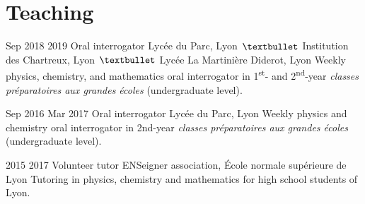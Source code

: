 \documentclass[letterpaper]{cvtemplate_en} %
\begin{document}
\section{Teaching}
\begin{cvbody}

\cvitem
	{Sep 2018}
	{2019}
	{Oral interrogator}
	{Lyc\'ee du Parc, Lyon $\textbullet$ Institution des Chartreux, Lyon $\textbullet$ Lyc\'ee La Martinière Diderot, Lyon }
	{}
	{}
	{Weekly physics, chemistry, and mathematics oral interrogator in 1\textsuperscript{st}- and 2\textsuperscript{nd}-year \textit{classes pr\'eparatoires aux grandes \'ecoles} (undergraduate level).\\}

\cvitem
	{Sep 2016}
	{Mar 2017}
	{Oral interrogator}
	{Lyc\'ee du Parc, Lyon }
	{}
	{}
	{Weekly physics and chemistry oral interrogator in 2nd-year \textit{classes pr\'eparatoires aux grandes \'ecoles} (undergraduate level).\\}

\cvitem
	{2015}
	{2017}
	{Volunteer tutor}
	{ENSeigner association, \'Ecole normale sup\'erieure de Lyon }
	{}
	{}
	{Tutoring in physics, chemistry and mathematics for high school students of Lyon.}

\end{cvbody}
\end{document}
